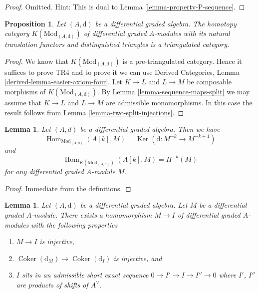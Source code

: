 \documentclass{stacks-project}
\theoremstyle{plain}
\newtheorem{proposition}[subsection]{Proposition}
\newtheorem{lemma}[subsection]{Lemma}
\theoremstyle{definition}
\theoremstyle{remark}
\numberwithin{equation}{subsection}
\def\Hom{\mathop{\mathrm{Hom}}\nolimits}
\def\Ker{\mathop{\mathrm{Ker}}}
\def\Coker{\mathop{\mathrm{Coker}}}
\begin{document}
\begin{proof}
Omitted. Hint: This is dual to Lemma \ref{lemma-property-P-sequence}.
\end{proof}

\begin{proposition}
\label{proposition-homotopy-category-triangulated}
Let $(A, \text{d})$ be a differential graded algebra. The homotopy category
$K(\text{Mod}_{(A, \text{d})})$ of differential graded $A$-modules with its
natural translation functors and distinguished triangles is a triangulated
category.
\end{proposition}

\begin{proof}
We know that $K(\text{Mod}_{(A, \text{d})})$ is a pre-triangulated category.
Hence it suffices to prove TR4 and to prove it we can use
Derived Categories, Lemma \ref{derived-lemma-easier-axiom-four}.
Let $K \to L$ and $L \to M$ be composable morphisms of
$K(\text{Mod}_{(A, \text{d})})$. By
Lemma \ref{lemma-sequence-maps-split} we may assume that
$K \to L$ and $L \to M$ are admissible monomorphisms.
In this case the result follows from
Lemma \ref{lemma-two-split-injections}.
\end{proof}

\begin{lemma}
\label{lemma-hom-from-shift-free}
Let $(A, d)$ be a differential graded algebra. Then we have
$$
\Hom_{\text{Mod}_{(A, \text{d})}}(A[k], M) =
\Ker(\text{d} : M^{-k} \to M^{-k + 1})
$$
and
$$
\Hom_{K(\text{Mod}_{(A, \text{d})})}(A[k], M) = H^{-k}(M)
$$
for any differential graded $A$-module $M$.
\end{lemma}

\begin{proof}
Immediate from the definitions.
\end{proof}

\begin{lemma}
\label{lemma-good-sub}
Let $(A, \text{d})$ be a differential graded algebra.
Let $M$ be a differential graded $A$-module. There exists a homomorphism
$M \to I$ of differential graded $A$-modules with the following
properties
\begin{enumerate}
\item $M \to I$ is injective,
\item $\Coker(\text{d}_M) \to \Coker(\text{d}_I)$ is injective,
and
\item $I$ sits in an admissible short exact sequence
$0 \to I' \to I \to I'' \to 0$ where $I'$, $I''$ are products
of shifts of $A^\vee$.
\end{enumerate}
\end{lemma}
\end{document}
